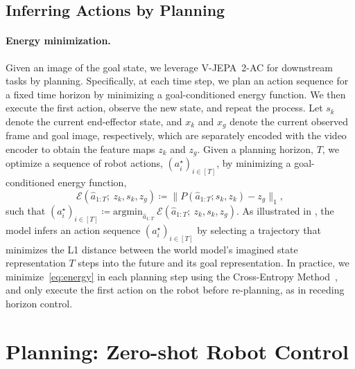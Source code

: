 \documentclass[]{fairmeta}
\newcommand{\acModel}{V-JEPA~2-AC\xspace}
\begin{document}
\subsection{Inferring Actions by Planning}

\paragraph{\bf Energy minimization.}
Given an image of the goal state, we leverage \acModel for downstream tasks by planning.
Specifically, at each time step, we plan an action sequence for a fixed time horizon by minimizing a goal-conditioned energy function.
We then execute the first action, observe the new state, and repeat the process.
Let $s_k$ denote the current end-effector state, and $x_k$ and $x_g$ denote the current observed frame and goal image, respectively, which are separately encoded with the video encoder to obtain the feature maps $z_k$ and $z_g$.
Given a planning horizon, $T$, we optimize a sequence of robot actions, $(a^\star_i)_{i \in [T]}$, by minimizing a goal-conditioned energy function,
\begin{equation}
    \label{eq:energy}
    \mathcal{E}(\hat{a}_{1:T};\ z_k, s_k, z_g) \coloneqq \lVert P(\hat{a}_{1:T}; s_k, z_k) - z_g \rVert_1,
\end{equation}
such that $(a^\star_i)_{i \in [T]} \coloneqq \text{argmin}_{\hat{a}_{1:T}}\ 
 \mathcal{E}(\hat{a}_{1:T};\ z_k, s_k, z_g)$.
As illustrated in , the model infers an action sequence $(a^\star_i)_{i \in [T]}$ by selecting a trajectory that minimizes the L1 distance between the world model's imagined state representation $T$ steps into the future and its goal representation.
In practice, we minimize~\eqref{eq:energy} in each planning step using the Cross-Entropy Method~\citep{rubinstein1997optimization}, and only execute the first action on the robot before re-planning, as in receding horizon control.


\section{Planning: Zero-shot Robot Control}
\label{sec:robot_planning}
\end{document}
